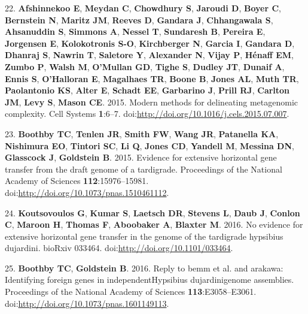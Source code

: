 \documentclass[11pt,]{article}
\begin{document}
22. \textbf{Afshinnekoo E}, \textbf{Meydan C}, \textbf{Chowdhury S},
\textbf{Jaroudi D}, \textbf{Boyer C}, \textbf{Bernstein N},
\textbf{Maritz JM}, \textbf{Reeves D}, \textbf{Gandara J},
\textbf{Chhangawala S}, \textbf{Ahsanuddin S}, \textbf{Simmons A},
\textbf{Nessel T}, \textbf{Sundaresh B}, \textbf{Pereira E},
\textbf{Jorgensen E}, \textbf{Kolokotronis S-O}, \textbf{Kirchberger N},
\textbf{Garcia I}, \textbf{Gandara D}, \textbf{Dhanraj S},
\textbf{Nawrin T}, \textbf{Saletore Y}, \textbf{Alexander N},
\textbf{Vijay P}, \textbf{Hénaff EM}, \textbf{Zumbo P}, \textbf{Walsh
M}, \textbf{O'Mullan GD}, \textbf{Tighe S}, \textbf{Dudley JT},
\textbf{Dunaif A}, \textbf{Ennis S}, \textbf{O'Halloran E},
\textbf{Magalhaes TR}, \textbf{Boone B}, \textbf{Jones AL}, \textbf{Muth
TR}, \textbf{Paolantonio KS}, \textbf{Alter E}, \textbf{Schadt EE},
\textbf{Garbarino J}, \textbf{Prill RJ}, \textbf{Carlton JM},
\textbf{Levy S}, \textbf{Mason CE}. 2015. Modern methods for delineating
metagenomic complexity. Cell Systems \textbf{1}:6--7.
doi:\url{http://doi.org/10.1016/j.cels.2015.07.007}.

23. \textbf{Boothby TC}, \textbf{Tenlen JR}, \textbf{Smith FW},
\textbf{Wang JR}, \textbf{Patanella KA}, \textbf{Nishimura EO},
\textbf{Tintori SC}, \textbf{Li Q}, \textbf{Jones CD}, \textbf{Yandell
M}, \textbf{Messina DN}, \textbf{Glasscock J}, \textbf{Goldstein B}.
2015. Evidence for extensive horizontal gene transfer from the draft
genome of a tardigrade. Proceedings of the National Academy of Sciences
\textbf{112}:15976--15981.
doi:\url{http://doi.org/10.1073/pnas.1510461112}.

24. \textbf{Koutsovoulos G}, \textbf{Kumar S}, \textbf{Laetsch DR},
\textbf{Stevens L}, \textbf{Daub J}, \textbf{Conlon C}, \textbf{Maroon
H}, \textbf{Thomas F}, \textbf{Aboobaker A}, \textbf{Blaxter M}. 2016.
No evidence for extensive horizontal gene transfer in the genome of the
tardigrade hypsibius dujardini. bioRxiv 033464.
doi:\url{http://doi.org/10.1101/033464}.

25. \textbf{Boothby TC}, \textbf{Goldstein B}. 2016. Reply to bemm et
al. and arakawa: Identifying foreign genes in independentHypsibius
dujardinigenome assemblies. Proceedings of the National Academy of
Sciences \textbf{113}:E3058--E3061.
doi:\url{http://doi.org/10.1073/pnas.1601149113}.
\end{document}
